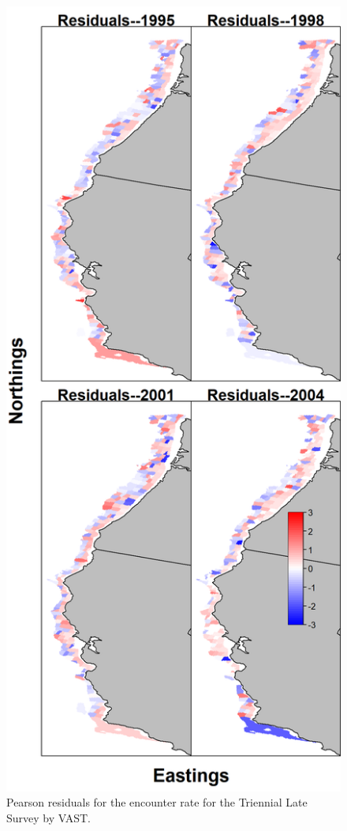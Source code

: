 \documentclass[12pt,]{article}
\begin{document}
\FloatBarrier

\begin{figure}
\centering
\includegraphics{Figures/tri_late_maps--encounter_pearson_resid.png}
\caption{Pearson residuals for the encounter rate for the Triennial Late
Survey by VAST. \label{fig:tri_late_enc_rate}}
\end{figure}
\end{document}
